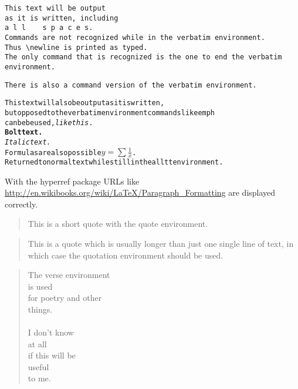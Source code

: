 \documentclass[11pt,a4paper,titlepage,onecolumn]{article}
\begin{document}
%
%
\begin{verbatim}
This text will be output
as it is written, including
a l l    s p a c e s.
Commands are not recognized while in the verbatim environment.
Thus \newline is printed as typed.
The only command that is recognized is the one to end the verbatim environment.
\end{verbatim}

\verb|There is also a command version of the verbatim environment.|

%
%
\begin{alltt}
This text will also be output as it is written,
but opposed to the verbatim environment commands like emph
can be be used, \emph{like this}.
\textbf{Bolt text.}
\textit{Italic text.}
Formulas are also possible \(y = \sum \frac{1}{x}\).
\normalfont{}Returned to normal text while still in the alltt environment.
\end{alltt}

%
%
With the hyperref package URLs like \url{http://en.wikibooks.org/wiki/LaTeX/Paragraph_Formatting} are displayed correctly.

%
%
\begin{comment}
\begin{listing}
-- Buffer input signals.
process (clk) is
begin
	if rising_edge(clk) then
		data_i_d1 <= data_i;
	end if;
end process;
\end{listing}
\end{comment}

%
%
\begin{quote}
This is a short quote with the quote environment.
\end{quote}

\begin{quotation}
This is a quote which is usually longer than just one single line of text,
in which case the quotation environment should be used.
\end{quotation}

\begin{verse}
The verse environment\\
is used\\
for poetry and other\\
things.\\
~\\
I don't know\\
at all\\
if this will be\\
useful\\
to me.
\end{verse}
\end{document}
